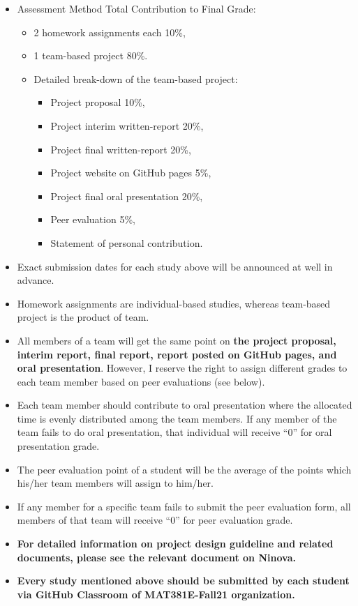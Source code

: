 \documentclass[
  12pt,
]{article}
\providecommand{\tightlist}{%
  \setlength{\itemsep}{0pt}\setlength{\parskip}{0pt}}
\begin{document}
\begin{itemize}
\item
  Assessment Method Total Contribution to Final Grade:

  \begin{itemize}
  \tightlist
  \item
    2 homework assignments each 10\%,
  \item
    1 team-based project 80\%.
  \item
    Detailed break-down of the team-based project:

    \begin{itemize}
    \tightlist
    \item
      Project proposal 10\%,
    \item
      Project interim written-report 20\%,
    \item
      Project final written-report 20\%,
    \item
      Project website on GitHub pages 5\%,
    \item
      Project final oral presentation 20\%,
    \item
      Peer evaluation 5\%,
    \item
      Statement of personal contribution.
    \end{itemize}
  \end{itemize}
\item
  Exact submission dates for each study above will be announced at well
  in advance.
\item
  Homework assignments are individual-based studies, whereas team-based
  project is the product of team.
\item
  All members of a team will get the same point on \textbf{the project
  proposal, interim report, final report, report posted on GitHub pages,
  and oral presentation}. However, I reserve the right to assign
  different grades to each team member based on peer evaluations (see
  below).
\item
  Each team member should contribute to oral presentation where the
  allocated time is evenly distributed among the team members. If any
  member of the team fails to do oral presentation, that individual will
  receive ``0'' for oral presentation grade.
\item
  The peer evaluation point of a student will be the average of the
  points which his/her team members will assign to him/her.
\item
  If any member for a specific team fails to submit the peer evaluation
  form, all members of that team will receive ``0'' for peer evaluation
  grade.
\item
  \textbf{For detailed information on project design guideline and
  related documents, please see the relevant document on Ninova.}
\item
  \textbf{Every study mentioned above should be submitted by each
  student via GitHub Classroom of MAT381E-Fall21 organization.}
\end{itemize}
\end{document}

